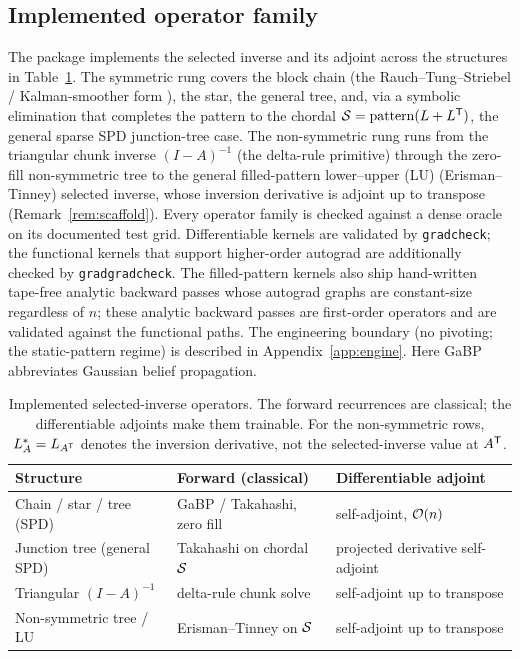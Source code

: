 \subsection{Implemented operator family}
\label{sec:kernels}

The package implements the selected inverse and its adjoint across the
structures in Table~\ref{tab:ladder}. The symmetric rung covers the
block chain (the Rauch--Tung--Striebel / Kalman-smoother form
\citep{rauch1965maximum}), the star, the
general tree, and, via a symbolic elimination that completes the pattern to
the chordal $\mathcal{S} = \mathrm{pattern}(L+L^{\mathsf{T}})$, the general sparse SPD
junction-tree case. The non-symmetric rung runs from the triangular chunk
inverse $(I-A)^{-1}$ (the delta-rule primitive) through the zero-fill
non-symmetric tree to the general filled-pattern lower--upper (LU)
(Erisman--Tinney) selected
inverse, whose inversion derivative is adjoint up to transpose
(Remark~\ref{rem:scaffold}). Every operator family is checked against a dense
oracle on its documented test grid. Differentiable kernels are validated by \texttt{gradcheck}; the
functional kernels that support higher-order autograd are additionally checked
by \texttt{gradgradcheck}. The filled-pattern kernels also ship hand-written
tape-free analytic backward passes whose autograd graphs are constant-size
regardless of $n$; these analytic backward passes are first-order operators and are validated
against the functional paths. The engineering boundary (no pivoting; the
static-pattern regime) is described in
Appendix~\ref{app:engine}.
Here GaBP abbreviates Gaussian belief propagation.

\begin{table}[htbp]
  \centering
  \caption{Implemented selected-inverse operators. The forward recurrences are
  classical; the differentiable adjoints make them trainable. For the
  non-symmetric rows, $L_A^*=L_{A^{\mathsf{T}}}$ denotes the inversion derivative, not
  the selected-inverse value at $A^{\mathsf{T}}$.}
  \label{tab:ladder}
  \begin{tabular}{lll}
    \toprule
    Structure & Forward (classical) & Differentiable adjoint \\
    \midrule
    Chain / star / tree (SPD)        & GaBP / Takahashi, zero fill        & self-adjoint, $\mathcal{O}(n)$ \\
    Junction tree (general SPD)      & Takahashi on chordal $\mathcal{S}$        & projected derivative self-adjoint \\
    Triangular $(I-A)^{-1}$          & delta-rule chunk solve             & self-adjoint up to transpose \\
    Non-symmetric tree / LU          & Erisman--Tinney on $\mathcal{S}$          & self-adjoint up to transpose \\
    \bottomrule
  \end{tabular}
\end{table}
